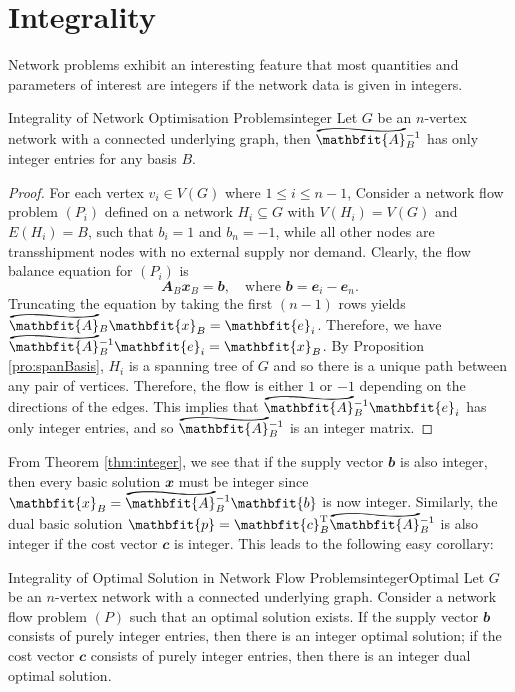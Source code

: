 \documentclass[math, code]{amznotes}
\renewcommand\widetilde[1]{\ThisStyle{%
  \setbox0=\hbox{$\SavedStyle#1$}%
  \stackengine{1pt-\LMpt}{$\SavedStyle#1$}{%
    \stretchto{\scaleto{\SavedStyle\mkern.2mu\sim}{.5467\wd0}}{.5\ht0}%
  }{O}{c}{F}{T}{S}%
}}
\theoremstyle{remark}
\begin{document}
\section{Integrality}
Network problems exhibit an interesting feature that most quantities and parameters of interest are integers if the network data is given in integers.
\begin{thmbox}{Integrality of Network Optimisation Problems}{integer}
    Let $G$ be an $n$-vertex network with a connected underlying graph, then $\widetilde{\mathbfit{A}}_B^{-1}$ has only integer entries for any basis $B$.
    \tcblower
    \begin{proof}
        For each vertex $v_i \in V(G)$ where $1 \leq i \leq n - 1$, Consider a network flow problem $(P_i)$ defined on a network $H_i \subseteq G$ with $V(H_i) = V(G)$ and $E(H_i) = B$, such that $b_i = 1$ and $b_n = -1$, while all other nodes are transshipment nodes with no external supply nor demand. Clearly, the flow balance equation for $(P_i)$ is 
        \begin{equation*}
            \mathbfit{A}_B\mathbfit{x}_B = \mathbfit{b}, \quad \textrm{where } \mathbfit{b} = \mathbfit{e}_i - \mathbfit{e}_n.
        \end{equation*}
        Truncating the equation by taking the first $(n - 1)$ rows yields $\widetilde{\mathbfit{A}}_B\mathbfit{x}_B = \mathbfit{e}_i$. Therefore, we have $\widetilde{\mathbfit{A}}_B^{-1}\mathbfit{e}_i = \mathbfit{x}_B$. By Proposition \ref{pro:spanBasis}, $H_i$ is a spanning tree of $G$ and so there is a unique path between any pair of vertices. Therefore, the flow is either $1$ or $-1$ depending on the directions of the edges. This implies that $\widetilde{\mathbfit{A}}_B^{-1}\mathbfit{e}_i$ has only integer entries, and so $\widetilde{\mathbfit{A}}_B^{-1}$ is an integer matrix.
    \end{proof}
\end{thmbox}
From Theorem \ref{thm:integer}, we see that if the supply vector $\mathbfit{b}$ is also integer, then every basic solution $\mathbfit{x}$ must be integer since $\mathbfit{x}_B = \widetilde{\mathbfit{A}}_B^{-1}\mathbfit{b}$ is now integer. Similarly, the dual basic solution $\mathbfit{p} = \mathbfit{c}^{\mathrm{T}}_B\widetilde{\mathbfit{A}}_B^{-1}$ is also integer if the cost vector $\mathbfit{c}$ is integer. This leads to the following easy corollary:
\begin{corbox}{Integrality of Optimal Solution in Network Flow Problems}{integerOptimal}
    Let $G$ be an $n$-vertex network with a connected underlying graph. Consider a network flow problem $(P)$ such that an optimal solution exists. If the supply vector $\mathbfit{b}$ consists of purely integer entries, then there is an integer optimal solution; if the cost vector $\mathbfit{c}$ consists of purely integer entries, then there is an integer dual optimal solution.
\end{corbox}
\end{document}
